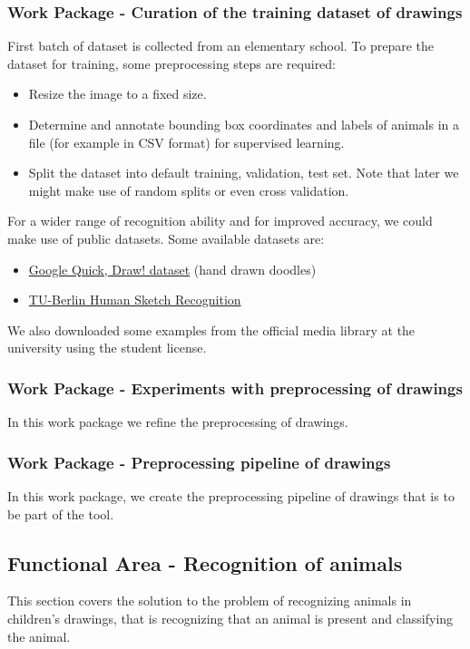 \subsubsection{Work Package - Curation of the training dataset of drawings}
First batch of dataset is collected from an elementary school.
To prepare the dataset for training, some preprocessing steps are required:
\begin{itemize}
\item Resize the image to a fixed size.
\item Determine and annotate bounding box coordinates and labels of animals in a file (for example in CSV format) for supervised learning.
\item Split the dataset into default training, validation, test set. Note that later we might make use of random splits or even cross validation.
\end{itemize}
For a wider range of recognition ability and for improved accuracy, we could make use of public datasets.
Some available datasets are:
\begin{itemize}
\item \href{https://github.com/googlecreativelab/quickdraw-dataset}{Google Quick, Draw! dataset} (hand drawn doodles)
\item \href{https://cybertron.cg.tu-berlin.de/eitz/projects/classifysketch/}{TU-Berlin Human Sketch Recognition}
\end{itemize}
We also downloaded some examples from the official media library at the university using the student license.

\subsubsection{Work Package - Experiments with preprocessing of drawings}
In this work package we refine the preprocessing of drawings.

\subsubsection{Work Package - Preprocessing pipeline of drawings}
In this work package, we create the preprocessing pipeline of drawings that is to be part of the tool.



\subsection{Functional Area - Recognition of animals}
This section covers the solution to the problem of recognizing animals in children's drawings, that is recognizing that an animal is present and classifying the animal.

